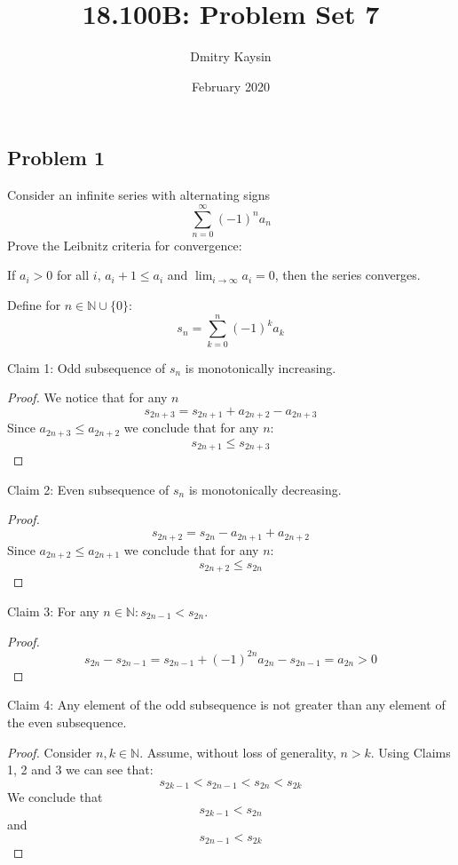 \documentclass{article}
\title{18.100B: Problem Set 7}
\author{Dmitry Kaysin}
\date{February 2020}
\newcommand{\N}{\mathbb{N}}
\begin{document}
\maketitle 

\subsection*{Problem 1}

\begin{tcolorbox}
Consider an infinite series with alternating signs
\[ \sum_{n=0}^\infty (-1)^n a_n \]
Prove the Leibnitz criteria for convergence:

If $a_i > 0$ for all $i$, $a_i+1 \leq a_i$ and $\lim_{i \to \infty} a_i = 0$, then the series converges.
\end{tcolorbox}

Define for $n \in \N \cup \{0\}$:
\[ s_n = \sum_{k=0}^{n} (-1)^k a_k \]

Claim 1: Odd subsequence of $s_n$ is monotonically increasing.

\begin{proof}

We notice that for any $n$
\[ s_{2n+3} = s_{2n+1} + a_{2n+2} - a_{2n+3} \]
Since $a_{2n+3} \leq a_{2n+2}$ we conclude that for any $n$:
\[ s_{2n+1} \leq s_{2n+3} \]

\end{proof}

Claim 2: Even subsequence of $s_n$ is monotonically decreasing.

\begin{proof}

\[ s_{2n+2} = s_{2n} - a_{2n+1} + a_{2n+2} \]
Since $a_{2n+2} \leq a_{2n+1}$ we conclude that for any $n$:
\[ s_{2n+2} \leq s_{2n} \]

\end{proof}

Claim 3: For any $n \in \N : s_{2n-1} < s_{2n}$.

\begin{proof}

\[ s_{2n} - s_{2n-1} = s_{2n-1} + (-1)^{2n} a_{2n} - s_{2n-1} = a_{2n} > 0 \]

\end{proof}

Claim 4: Any element of the odd subsequence is not greater than any element of the even subsequence.

\begin{proof}

Consider $n, k \in \N$. Assume, without loss of generality, $n > k$.
Using Claims 1, 2 and 3 we can see that:
\[ s_{2k-1} < s_{2n-1} < s_{2n} < s_{2k} \]
We conclude that
\[ s_{2k-1} < s_{2n} \]
and
\[ s_{2n-1} < s_{2k} \]

\end{proof}
\end{document}
